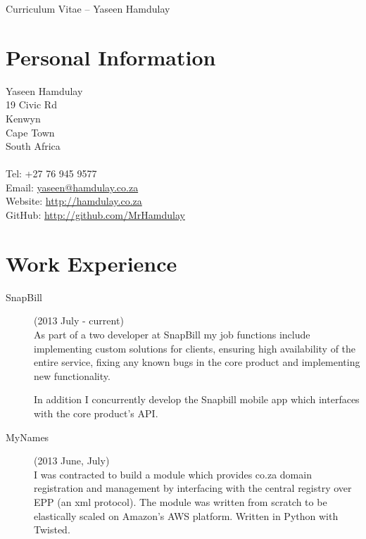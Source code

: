 \documentclass[margin,line,a4paper]{resume}
\begin{document}
    {\sc \Large Curriculum Vitae -- Yaseen Hamdulay}
    \begin{resume}
        \vspace{0.5cm}

        \section{\mysidestyle Personal Information}
            Yaseen Hamdulay\\
            19 Civic Rd\\ %
            Kenwyn\\
            Cape Town\\
            South Africa\\
            \\
            Tel: +27 76 945 9577\\
            Email: \href{mailto:yaseen@hamdulay.co.za}{yaseen@hamdulay.co.za}\\
            Website: \href{http://hamdulay.co.za}{http://hamdulay.co.za}\\
            GitHub: \href{http://github.com/MrHamdulay}{http://github.com/MrHamdulay}\\

        \section{\mysidestyle Work Experience}
            \begin{description}
                \item[SnapBill] (2013 July - current) \\
                    As part of a two developer at SnapBill my job functions include implementing 
                    custom  solutions for clients, ensuring high availability of the entire 
                    service, fixing any known bugs in the core product and implementing new 
                    functionality.

                    In addition I concurrently develop the Snapbill mobile app which interfaces 
                    with the core product's API.

                \item[MyNames] (2013 June, July) \\
                    I was contracted to build a module which provides co.za domain registration 
                    and management by interfacing with the central registry over EPP (an xml
                    protocol). The module was written from scratch to be elastically scaled on 
                    Amazon's AWS platform. Written in Python with Twisted.


\end{description}
\end{resume}
\end{document}
